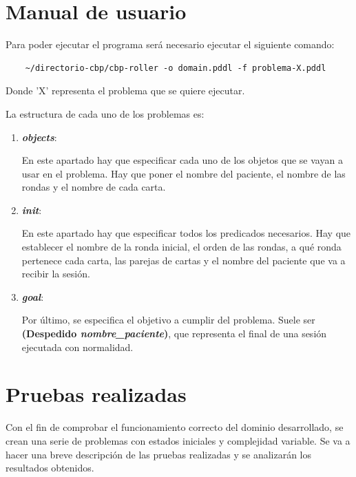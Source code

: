 \documentclass{uc3mpracticas}
\begin{document}
  \section{Manual de usuario}

  Para poder ejecutar el programa será necesario ejecutar el siguiente comando:

  \vspace{2mm}

  \begin{lstlisting}
    ~/directorio-cbp/cbp-roller -o domain.pddl -f problema-X.pddl
  \end{lstlisting}

  \vspace{2mm}

  Donde 'X' representa el problema que se quiere ejecutar.

  \vspace{4mm}

  La estructura de cada uno de los problemas es:

  \begin{enumerate}
    \item \textbf{\textit{objects}}:

    En este apartado hay que especificar cada uno de los objetos que se vayan a usar en el problema. Hay que poner el nombre del paciente, el nombre de las rondas y el nombre de cada carta.

    \item \textbf{\textit{init}}:

    En este apartado hay que especificar todos los predicados necesarios. Hay que establecer el nombre de la ronda inicial, el orden de las rondas, a qué ronda pertenece cada carta, las parejas de cartas y el nombre del paciente que va a recibir la sesión.

    \item \textbf{\textit{goal}}:

    Por último, se especifica el objetivo a cumplir del problema. Suele ser \textbf{(Despedido \textit{nombre\_paciente})}, que representa el final de una sesión ejecutada con normalidad.

  \end{enumerate}



  \section{Pruebas realizadas}

  Con el fin de comprobar el funcionamiento correcto del dominio desarrollado, se crean una serie de problemas con estados iniciales y complejidad variable. Se va a hacer una breve descripción de las pruebas realizadas y se analizarán los resultados obtenidos.
\end{document}
